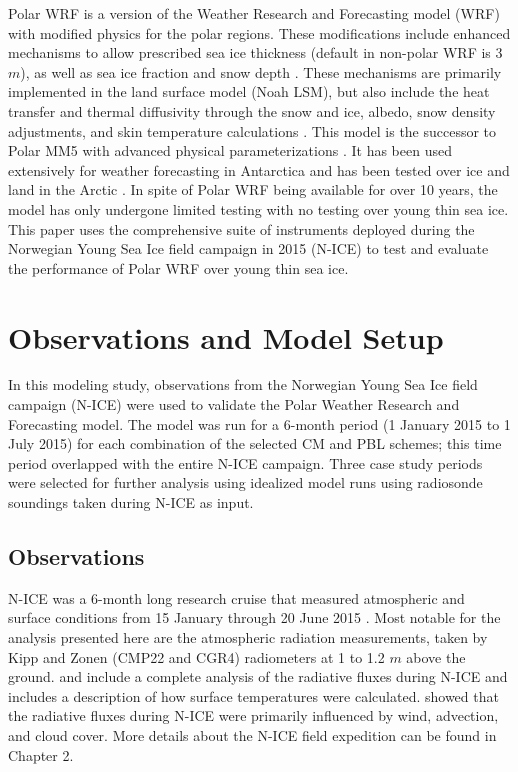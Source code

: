 Polar WRF is a version of the Weather Research and Forecasting model (WRF) with modified physics for the polar regions. These modifications include enhanced mechanisms to allow prescribed sea ice thickness (default in non-polar WRF is 3 $m$), as well as sea ice fraction and snow depth \citep{hines:2015}. These mechanisms are primarily implemented in the land surface model (Noah LSM), but also include the heat transfer and thermal diffusivity through the snow and ice, albedo, snow density adjustments, and skin temperature calculations \citep{tastula:2012, hines:2015}. This model is the successor to Polar MM5 with advanced physical parameterizations \citep{bromwich:2009}. It has been used extensively for weather forecasting in Antarctica \citep{powers:2012} and has been tested over ice and land in the Arctic \citep{tastula:2012, bromwich:2009}. In spite of Polar WRF being available for over 10 years, the model has only undergone limited testing with no testing over young thin  sea ice. This paper  uses the comprehensive suite of instruments deployed during the Norwegian Young Sea Ice field campaign in 2015 (N-ICE) to test and evaluate the performance of Polar WRF over young thin sea ice. 


\section{Observations and Model Setup}

In this modeling study, observations from the Norwegian Young Sea Ice field campaign (N-ICE) were used to validate the Polar Weather Research and Forecasting model. The model was run for a 6-month period (1 January 2015 to 1 July 2015) for each combination of the selected CM and PBL schemes; this time period overlapped with the entire N-ICE campaign. Three case study periods were selected for further analysis using idealized model runs using radiosonde soundings taken during N-ICE as input.

\subsection{Observations}
N-ICE was a 6-month long research cruise that measured atmospheric and surface conditions from 15 January through 20 June 2015 \citep{granskog:2015}. Most notable for the analysis presented here are the atmospheric radiation measurements, taken by Kipp and Zonen (CMP22 and CGR4) radiometers at 1 to 1.2 $m$ above the ground. \citet{granskog:2015} and \citet{walden:2017} include a complete analysis of the radiative fluxes during N-ICE and includes a description of how surface temperatures were calculated. \citet{walden:2017} showed that the radiative fluxes during N-ICE were primarily influenced by wind, advection, and cloud cover. More details about the N-ICE field expedition can be found in Chapter 2.



